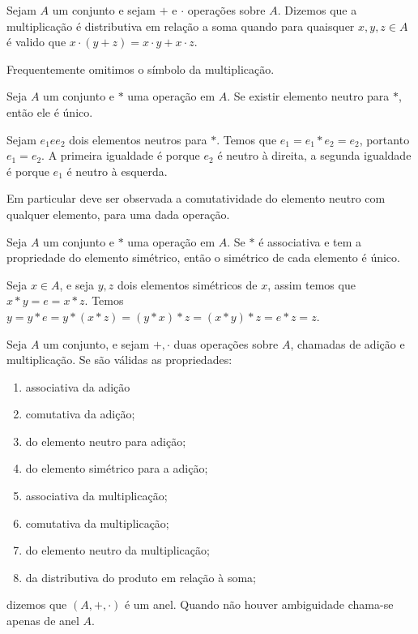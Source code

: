 \documentclass[../main.tex]{subfiles}
\begin{document}
\begin{defi}
    Sejam $A$ um conjunto e sejam $+$ e $\cdot$ operações sobre $A$. Dizemos que a multiplicação é distributiva em relação a soma quando para quaisquer $x, y, z \in A$ é valido que $x \cdot (y + z) = x\cdot y + x\cdot z$.
\end{defi}
Frequentemente omitimos o símbolo da multiplicação.

\begin{teo}
    Seja $A$ um conjunto e $*$ uma operação em $A$. Se existir elemento neutro para $*$, então ele é único.
\end{teo}
\begin{dem}
    Sejam $e_1 e e_2$ dois elementos neutros para $*$. Temos que $e_1 = e_1 * e_2 = e_2$, portanto $e_1 = e_2$. A primeira igualdade é porque $e_2$ é neutro à direita, a segunda igualdade é porque $e_1$ é neutro à esquerda.
\end{dem}
Em particular deve ser observada a comutatividade do elemento neutro com qualquer elemento, para uma dada operação.
\begin{teo}
    Seja $A$ um conjunto e $*$ uma operação em $A$. Se $*$ é associativa e tem a propriedade do elemento simétrico, então o simétrico de cada elemento é único.
\end{teo}
\begin{dem}
    Seja $x \in A$, e seja $y, z$ dois elementos simétricos de $x$, assim temos que $x*y = e = x*z$. 
    Temos $y = y * e = y * (x * z) = (y * x) * z = ( x * y ) * z = e * z = z$.
\end{dem}

\begin{defi}
    Seja $A$ um conjunto, e sejam $+, \cdot$ duas operações sobre $A$, chamadas de adição e multiplicação. Se são válidas as propriedades:
    \begin{enumerate}[label=(\roman*)]
        \item associativa da adição
        \item comutativa da adição;
        \item do elemento neutro para adição;
        \item do elemento simétrico para a adição;
        \item associativa da multiplicação;
        \item comutativa da multiplicação;
        \item do elemento neutro da multiplicação;
        \item da distributiva do produto em relação à soma;
    \end{enumerate}
    dizemos que $(A, +, \cdot)$ é um anel. Quando não houver ambiguidade chama-se apenas de anel $A$.

\end{defi}
\end{document}
